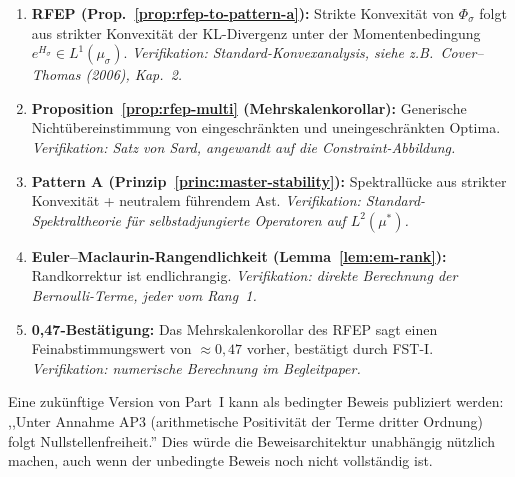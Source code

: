 \documentclass[12pt,a4paper]{article}
\theoremstyle{definition}
\theoremstyle{remark}
\begin{document}
\begin{enumerate}
\item \textbf{RFEP (Prop.~\ref{prop:rfep-to-pattern-a}):} Strikte Konvexität von $\Phi_\sigma$ folgt aus strikter Konvexität der KL-Divergenz unter der Momentenbedingung $e^{H_\sigma} \in L^1(\mu_\sigma)$. \emph{Verifikation: Standard-Konvexanalysis, siehe z.B.\ Cover--Thomas (2006), Kap.~2.}

\item \textbf{Proposition~\ref{prop:rfep-multi} (Mehrskalenkorollar):} Generische Nichtübereinstimmung von eingeschränkten und uneingeschränkten Optima. \emph{Verifikation: Satz von Sard, angewandt auf die Constraint-Abbildung.}

\item \textbf{Pattern A (Prinzip~\ref{princ:master-stability}):} Spektrallücke aus strikter Konvexität + neutralem führendem Ast. \emph{Verifikation: Standard-Spektraltheorie für selbstadjungierte Operatoren auf $L^2(\mu^*)$.}

\item \textbf{Euler--Maclaurin-Rangendlichkeit (Lemma~\ref{lem:em-rank}):} Randkorrektur ist endlichrangig. \emph{Verifikation: direkte Berechnung der Bernoulli-Terme, jeder vom Rang~1.}

\item \textbf{0,47-Bestätigung:} Das Mehrskalenkorollar des RFEP sagt einen Feinabstimmungswert von $\approx 0{,}47$ vorher, bestätigt durch FST-I. \emph{Verifikation: numerische Berechnung im Begleitpaper.}
\end{enumerate}

\noindent
Eine zukünftige Version von Part~I kann als bedingter Beweis publiziert werden: ,,Unter Annahme AP3 (arithmetische Positivität der Terme dritter Ordnung) folgt Nullstellenfreiheit.'' Dies würde die Beweisarchitektur unabhängig nützlich machen, auch wenn der unbedingte Beweis noch nicht vollständig ist.
\end{document}
